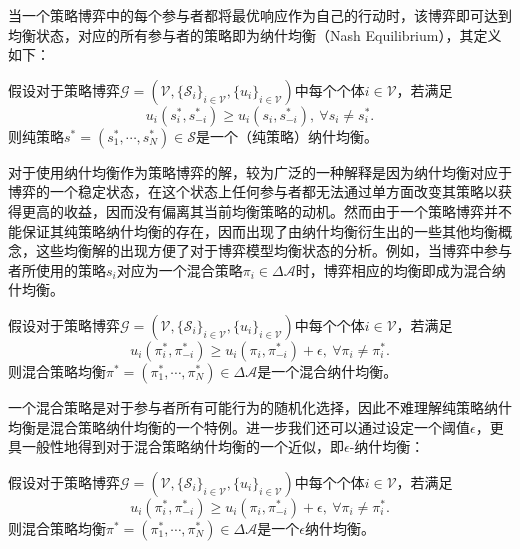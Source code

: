 当一个策略博弈中的每个参与者都将最优响应作为自己的行动时，该博弈即可达到均衡状态，对应的所有参与者的策略即为纳什均衡（Nash Equilibrium）\cite{Nash1951}，其定义如下：
\begin{df}[纳什均衡]
假设对于策略博弈$\mathcal{G}=(\mathcal{V},\{\mathcal{S}_i\}_{i\in\mathcal{V}},\{u_i\}_{i\in\mathcal{V}})$中每个个体$i\in\mathcal{V}$，若满足
\begin{equation}\label{}
u_{i}(s_{i}^*,s_{-i}^*)\ge u_{i}(s_{i},s_{-i}^*),~\forall s_i\ne s_i^*.
\end{equation}
则纯策略$s^*=(s_{1}^*,\cdots,s_{N}^*)\in\mathcal{S}$是一个（纯策略）纳什均衡。
\end{df}
对于使用纳什均衡作为策略博弈的解，较为广泛的一种解释是因为纳什均衡对应于博弈的一个稳定状态，在这个状态上任何参与者都无法通过单方面改变其策略以获得更高的收益，因而没有偏离其当前均衡策略的动机。然而由于一个策略博弈并不能保证其纯策略纳什均衡的存在，因而出现了由纳什均衡衍生出的一些其他均衡概念，这些均衡解的出现方便了对于博弈模型均衡状态的分析。例如，当博弈中参与者所使用的策略$s_i$对应为一个混合策略$\pi_i\in\Delta\mathcal{A}$时，博弈相应的均衡即成为混合纳什均衡\cite{Fudenberg,Lasaulce2011}。
\begin{df}[混合纳什均衡]
假设对于策略博弈$\mathcal{G}=(\mathcal{V},\{\mathcal{S}_i\}_{i\in\mathcal{V}},\{u_i\}_{i\in\mathcal{V}})$中每个个体$i\in\mathcal{V}$，若满足
\begin{equation}\label{}
u_{i}(\pi_{i}^*,\pi_{-i}^*)\ge u_{i}(\pi_{i},\pi_{-i}^*) + \epsilon,~\forall \pi_i\ne\pi_i^*.
\end{equation}
则混合策略均衡$\pi^*=(\pi_{1}^*,\cdots,\pi_{N}^*)\in\Delta\mathcal{A}$是一个混合纳什均衡。
\end{df}

一个混合策略是对于参与者所有可能行为的随机化选择，因此不难理解纯策略纳什均衡是混合策略纳什均衡的一个特例。进一步我们还可以通过设定一个阈值$\epsilon$，更具一般性地得到对于混合策略纳什均衡的一个近似，即$\epsilon$-纳什均衡\cite{Fudenberg,Lasaulce2011}：
\begin{df}
假设对于策略博弈$\mathcal{G}=(\mathcal{V},\{\mathcal{S}_i\}_{i\in\mathcal{V}},\{u_i\}_{i\in\mathcal{V}})$中每个个体$i\in\mathcal{V}$，若满足
\begin{equation}\label{}
u_{i}(\pi_{i}^*,\pi_{-i}^*)\ge u_{i}(\pi_{i},\pi_{-i}^*) + \epsilon,~\forall \pi_i\ne\pi_i^*.
\end{equation}
则混合策略均衡$\pi^*=(\pi_{1}^*,\cdots,\pi_{N}^*)\in\Delta\mathcal{A}$是一个$\epsilon$纳什均衡。
\end{df}

